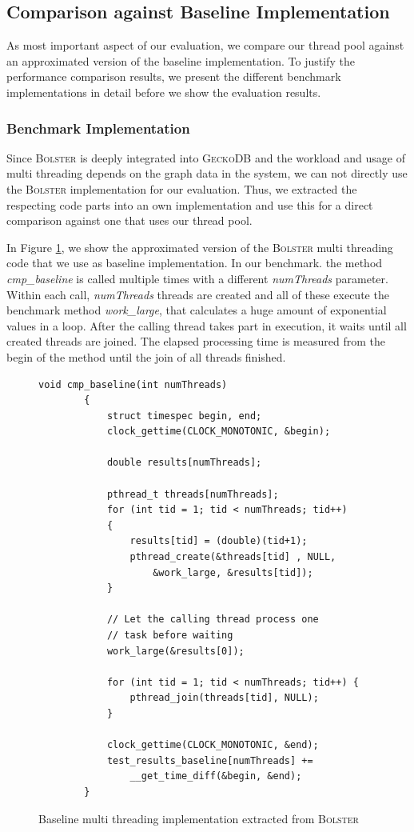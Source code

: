\documentclass[conference]{IEEEtran}
\begin{document}
\subsection{Comparison against Baseline Implementation}
As most important aspect of our evaluation, we compare our thread pool against an approximated version of the baseline implementation. To justify the performance comparison results, we present the different benchmark implementations in detail before we show the evaluation results.

\subsubsection{Benchmark Implementation}
Since \textsc{Bolster} is deeply integrated into \textsc{GeckoDB} and the workload and usage of multi threading depends on the graph data in the system, we can not directly use the \textsc{Bolster} implementation for our evaluation. Thus, we extracted the respecting code parts into an own implementation and use this for a direct comparison against one that uses our thread pool. 

In Figure \ref{fig4}, we show the approximated version of the \textsc{Bolster} multi threading code that we use as baseline implementation. In our benchmark. the method \emph{cmp\_baseline} is called multiple times with a different \emph{numThreads} parameter. Within each call, \emph{numThreads} threads are created and all of these execute the benchmark method \emph{work\_large}, that calculates a huge amount of exponential values in a loop. After the calling thread takes part in execution, it waits until all created threads are joined. The elapsed processing time is measured from the begin of the method until the join of all threads finished.

\begin{figure}
	\begin{lstlisting}[style=CStyle,numbers=none]
		void cmp_baseline(int numThreads)
		{
			struct timespec begin, end;
			clock_gettime(CLOCK_MONOTONIC, &begin);
			
			double results[numThreads];
			
			pthread_t threads[numThreads];
			for (int tid = 1; tid < numThreads; tid++)
			{
				results[tid] = (double)(tid+1);
				pthread_create(&threads[tid] , NULL, 
					&work_large, &results[tid]);
			}
			
			// Let the calling thread process one 
			// task before waiting
			work_large(&results[0]);
			
			for (int tid = 1; tid < numThreads; tid++) {
				pthread_join(threads[tid], NULL);
			}
			
			clock_gettime(CLOCK_MONOTONIC, &end);
			test_results_baseline[numThreads] +=
				__get_time_diff(&begin, &end);
		}
	\end{lstlisting}
	\caption{Baseline multi threading implementation extracted from \textsc{Bolster}}
	\label{fig4}
\end{figure}
\end{document}
